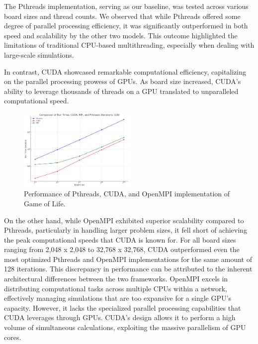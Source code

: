 \documentclass[11pt,twocolumn]{article}
\begin{document}
The Pthreads implementation, serving as our baseline, was tested across various board sizes and thread counts. We observed that while Pthreads offered some degree of parallel processing efficiency, it was significantly outperformed in both speed and scalability by the other two models. This outcome highlighted the limitations of traditional CPU-based multithreading, especially when dealing with large-scale simulations.

In contrast, CUDA showcased remarkable computational efficiency, capitalizing on the parallel processing prowess of GPUs. As board size increased, CUDA’s ability to leverage thousands of threads on a GPU translated to unparalleled computational speed. 

\begin{figure}[!htbp]
    \centering
    \includegraphics[width=0.5\textwidth]{newComp.png}
    \caption{Performance of Pthreads, CUDA, and OpenMPI implementation of Game of Life.}
    \label{fig:comp}
\end{figure}

On the other hand, while OpenMPI exhibited superior scalability compared to Pthreads, particularly in handling larger problem sizes, it fell short of achieving the peak computational speeds that CUDA is known for. For all board sizes ranging from 2,048 x 2,048 to 32,768 x 32,768, CUDA outperformed even the most optimized Pthreads and OpenMPI implementations for the same amount of 128 iterations. This discrepancy in performance can be attributed to the inherent architectural differences between the two frameworks. OpenMPI excels in distributing computational tasks across multiple CPUs within a network, effectively managing simulations that are too expansive for a single GPU's capacity. However, it lacks the specialized parallel processing capabilities that CUDA leverages through GPUs. CUDA's design allows it to perform a high volume of simultaneous calculations, exploiting the massive parallelism of GPU cores. 
\end{document}
